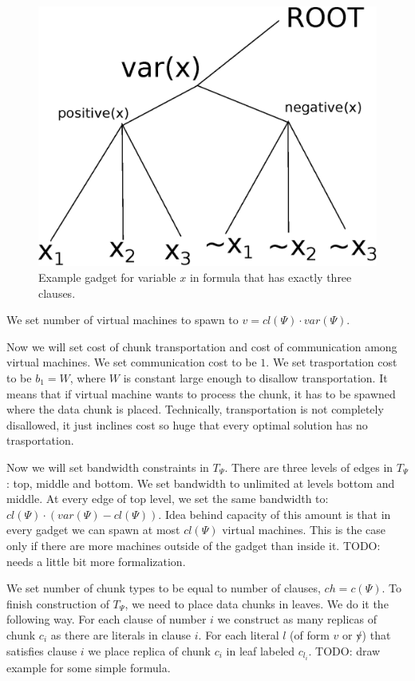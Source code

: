 \begin{figure}[htbp]
\includegraphics[width = \columnwidth]{figs/gadget-no-bw.eps}
\caption{Example gadget for variable $x$ in formula that has exactly
three clauses.}
\label{fig:gadgets}
\end{figure}

We set number of virtual machines to spawn to $v = cl(\Psi) \cdot var(\Psi)$.

Now we will set cost of chunk transportation and cost of communication
among virtual machines. We set communication cost to be $1$. We set
trasportation cost to be $b_1 = W$, where $W$ is constant large enough
to disallow transportation. It means that if virtual machine wants to
process the chunk, it has to be spawned where the data chunk is
placed. Technically, transportation is not completely disallowed, it
just inclines cost so huge that every optimal solution has no
trasportation.

Now we will set bandwidth constraints in $T_{\Psi}$. There are three
levels of edges in $T_{\Psi}$: top, middle and bottom. We set
bandwidth to unlimited at levels bottom and middle. At every edge of
top level, we set the same bandwidth to: $cl(\Psi) \cdot (var(\Psi) -
cl(\Psi))$. Idea behind capacity of this amount is that in every gadget we can
spawn at most $cl(\Psi)$ virtual machines. This is the case only if
there are more machines outside of the gadget than inside it. TODO:
needs a little bit more formalization.

We set number of chunk types to be equal to number of clauses, $ch =
c(\Psi)$. To finish construction of $T_{\Psi}$, we need to place data chunks in
leaves. We do it the following way. For each clause of number $i$ we
construct as many replicas of chunk $c_i$ as there are literals in
clause $i$. For each literal $l$ (of form $v$ or $\not v$) that satisfies clause $i$ we place
replica of chunk $c_i$ in leaf labeled $c_{l_i}$. TODO: draw example for
some simple formula.

